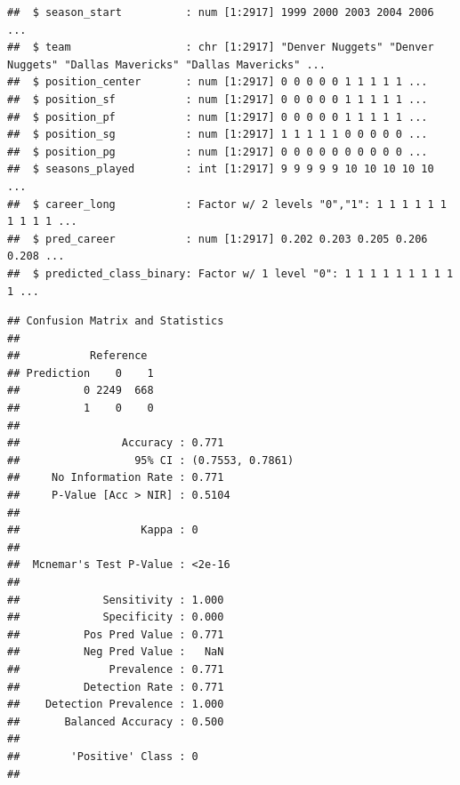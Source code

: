 \documentclass[
]{book}
\newenvironment{Shaded}{\begin{snugshade}}{\end{snugshade}}
\newcommand{\AttributeTok}[1]{\textcolor[rgb]{0.13,0.29,0.53}{#1}}
\newcommand{\FunctionTok}[1]{\textcolor[rgb]{0.13,0.29,0.53}{\textbf{#1}}}
\newcommand{\NormalTok}[1]{#1}
\newcommand{\SpecialCharTok}[1]{\textcolor[rgb]{0.81,0.36,0.00}{\textbf{#1}}}
\begin{document}
\begin{verbatim}
##  $ season_start          : num [1:2917] 1999 2000 2003 2004 2006 ...
##  $ team                  : chr [1:2917] "Denver Nuggets" "Denver Nuggets" "Dallas Mavericks" "Dallas Mavericks" ...
##  $ position_center       : num [1:2917] 0 0 0 0 0 1 1 1 1 1 ...
##  $ position_sf           : num [1:2917] 0 0 0 0 0 1 1 1 1 1 ...
##  $ position_pf           : num [1:2917] 0 0 0 0 0 1 1 1 1 1 ...
##  $ position_sg           : num [1:2917] 1 1 1 1 1 0 0 0 0 0 ...
##  $ position_pg           : num [1:2917] 0 0 0 0 0 0 0 0 0 0 ...
##  $ seasons_played        : int [1:2917] 9 9 9 9 9 10 10 10 10 10 ...
##  $ career_long           : Factor w/ 2 levels "0","1": 1 1 1 1 1 1 1 1 1 1 ...
##  $ pred_career           : num [1:2917] 0.202 0.203 0.205 0.206 0.208 ...
##  $ predicted_class_binary: Factor w/ 1 level "0": 1 1 1 1 1 1 1 1 1 1 ...
\end{verbatim}

\begin{Shaded}
\end{Shaded}

\begin{verbatim}
## Confusion Matrix and Statistics
## 
##           Reference
## Prediction    0    1
##          0 2249  668
##          1    0    0
##                                           
##                Accuracy : 0.771           
##                  95% CI : (0.7553, 0.7861)
##     No Information Rate : 0.771           
##     P-Value [Acc > NIR] : 0.5104          
##                                           
##                   Kappa : 0               
##                                           
##  Mcnemar's Test P-Value : <2e-16          
##                                           
##             Sensitivity : 1.000           
##             Specificity : 0.000           
##          Pos Pred Value : 0.771           
##          Neg Pred Value :   NaN           
##              Prevalence : 0.771           
##          Detection Rate : 0.771           
##    Detection Prevalence : 1.000           
##       Balanced Accuracy : 0.500           
##                                           
##        'Positive' Class : 0               
## 
\end{verbatim}
\end{document}
